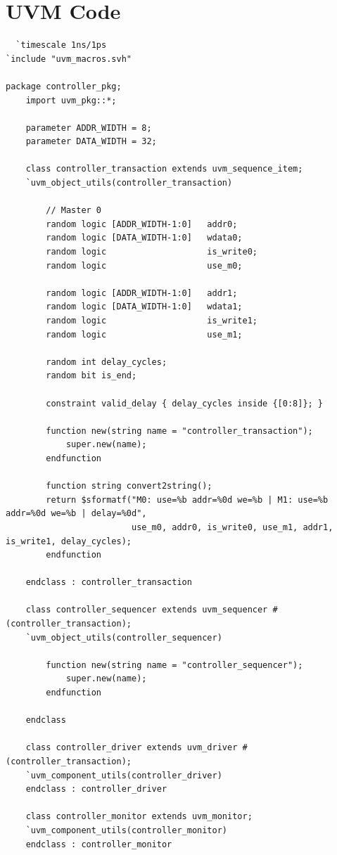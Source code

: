 \documentclass{article}
\begin{document}
\section{UVM Code}
\begin{verbatim}
  `timescale 1ns/1ps
`include "uvm_macros.svh"

package controller_pkg;
    import uvm_pkg::*;

    parameter ADDR_WIDTH = 8;
    parameter DATA_WIDTH = 32;

    class controller_transaction extends uvm_sequence_item;
    `uvm_object_utils(controller_transaction)

        // Master 0
        random logic [ADDR_WIDTH-1:0]   addr0;
        random logic [DATA_WIDTH-1:0]   wdata0;
        random logic                    is_write0;
        random logic                    use_m0;

        random logic [ADDR_WIDTH-1:0]   addr1;
        random logic [DATA_WIDTH-1:0]   wdata1;
        random logic                    is_write1;
        random logic                    use_m1;

        random int delay_cycles;
        random bit is_end;

        constraint valid_delay { delay_cycles inside {[0:8]}; }

        function new(string name = "controller_transaction");
            super.new(name);
        endfunction

        function string convert2string();
        return $sformatf("M0: use=%b addr=%0d we=%b | M1: use=%b addr=%0d we=%b | delay=%0d",
                         use_m0, addr0, is_write0, use_m1, addr1, is_write1, delay_cycles);
        endfunction

    endclass : controller_transaction

    class controller_sequencer extends uvm_sequencer #(controller_transaction);
    `uvm_object_utils(controller_sequencer)

        function new(string name = "controller_sequencer");
            super.new(name);
        endfunction

    endclass

    class controller_driver extends uvm_driver #(controller_transaction);
    `uvm_component_utils(controller_driver)
    endclass : controller_driver

    class controller_monitor extends uvm_monitor;
    `uvm_component_utils(controller_monitor)
    endclass : controller_monitor


\end{verbatim}
\end{document}
